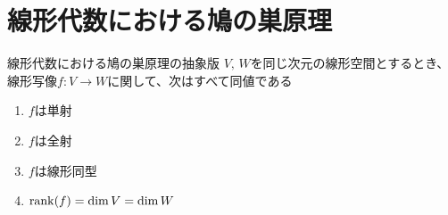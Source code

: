 \documentclass[../../../topic_linear-algebra]{subfiles}
\begin{document}
\sectionline
\section{線形代数における鳩の巣原理}

\begin{theorem}{線形代数における鳩の巣原理の抽象版}\label{thm:abstract-linear-pigeonhole}
  $V,\,W$を同じ次元の線形空間とするとき、線形写像$f\colon V \to W$に関して、次はすべて同値である
  \begin{enumerate}[label=\romanlabel]
    \item $f$は単射
    \item $f$は全射
    \item $f$は線形同型
    \item $\rank(f) = \dim V = \dim W$
  \end{enumerate}
\end{theorem}
\end{document}
